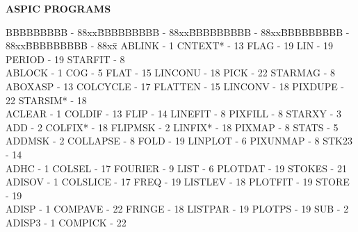 \newpage
\begin{center}
{\Large\bf ASPIC PROGRAMS}
\end{center}

{\scriptsize
\begin{tabbing}
BBBBBBBBB - 88xx\=BBBBBBBBB - 88xx\=BBBBBBBBB - 88xx\=BBBBBBBBB - 88xx\=BBBBBBBBB - 88xx\=\kill
 ABLINK - 1                              \>CNTEXT* - 13
   \>FLAG - 19                               \>
 LIN - 19                                \>PERIOD - 19
   \>STARFIT - 8                             \\
 ABLOCK - 1                              \>COG - 5
   \>FLAT - 15                               \>
 LINCONU - 18                            \>PICK - 22
   \>STARMAG - 8                             \\
 ABOXASP - 13                            \>COLCYCLE - 17
   \>FLATTEN - 15                            \>
 LINCONV - 18                            \>PIXDUPE - 22
   \>STARSIM* - 18                           \\
 ACLEAR - 1                              \>COLDIF - 13
   \>FLIP - 14                               \>
 LINEFIT - 8                             \>PIXFILL - 8
   \>STARXY - 3                              \\
 ADD - 2                                 \>COLFIX* - 18
   \>FLIPMSK - 2                             \>
 LINFIX* - 18                            \>PIXMAP - 8
   \>STATS - 5                               \\
 ADDMSK - 2                              \>COLLAPSE - 8
   \>FOLD - 19                               \>
 LINPLOT - 6                             \>PIXUNMAP - 8
   \>STK23 - 14                              \\
 ADHC - 1                                \>COLSEL - 17
   \>FOURIER - 9                             \>
 LIST - 6                                \>PLOTDAT - 19
   \>STOKES - 21                             \\
 ADISOV - 1                              \>COLSLICE - 17
   \>FREQ - 19                               \>
 LISTLEV - 18                            \>PLOTFIT - 19
   \>STORE - 19                              \\
 ADISP - 1                               \>COMPAVE - 22
   \>FRINGE - 18                             \>
 LISTPAR - 19                            \>PLOTPS - 19
   \>SUB - 2                                 \\
 ADISP3 - 1                              \>COMPICK - 22

\end{tabbing}}
